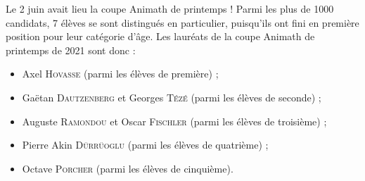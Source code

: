 
Le 2 juin avait lieu la coupe Animath de printemps !
Parmi les plus de 1000 candidats, 7 élèves se sont distingués en particulier,
puisqu'ils ont fini en première position pour leur catégorie d'âge.
Les lauréats de la coupe Animath de printemps de 2021 sont donc :
\begin{itemize}
 \item Axel  \textsc{Hovasse} (parmi les élèves de première) ;
 \item Gaëtan \textsc{Dautzenberg} et Georges \textsc{Tézé} (parmi les élèves de seconde) ;
 \item Auguste \textsc{Ramondou} et Oscar \textsc{Fischler} (parmi les élèves de troisième) ;
 \item Pierre Akin \textsc{Dürrüoglu} (parmi les élèves de quatrième) ;
 \item Octave \textsc{Porcher} (parmi les élèves de cinquième).
\end{itemize}

\bigskip






